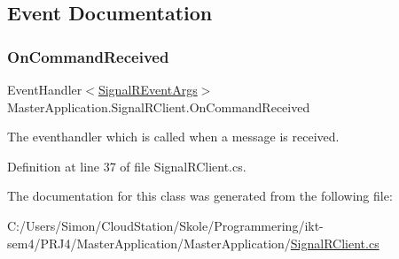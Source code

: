 \subsection{Event Documentation}
\mbox{\label{class_master_application_1_1_signal_r_client_a96f1903916cbf1732ceebebbc086b10b}} 
\subsubsection{\texorpdfstring{On\+Command\+Received}{OnCommandReceived}}
{\footnotesize\ttfamily Event\+Handler$<$\mbox{\hyperlink{class_master_application_1_1_signal_r_event_args}{Signal\+R\+Event\+Args}}$>$ Master\+Application.\+Signal\+R\+Client.\+On\+Command\+Received}

The eventhandler which is called when a message is received. 

Definition at line 37 of file Signal\+R\+Client.\+cs.



The documentation for this class was generated from the following file\+:\begin{DoxyCompactItemize}
\item 
C\+:/\+Users/\+Simon/\+Cloud\+Station/\+Skole/\+Programmering/ikt-\/sem4/\+P\+R\+J4/\+Master\+Application/\+Master\+Application/\mbox{\hyperlink{_signal_r_client_8cs}{Signal\+R\+Client.\+cs}}\end{DoxyCompactItemize}
